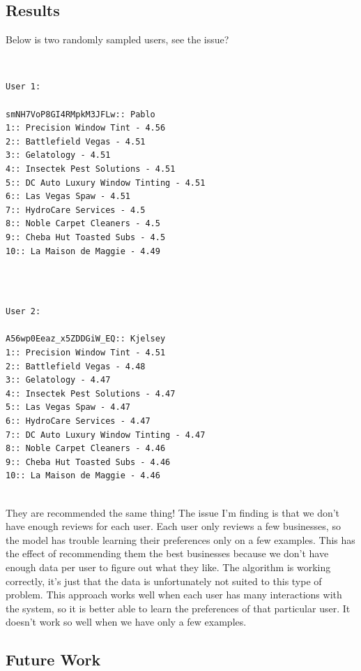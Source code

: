 \documentclass{article}
\begin{document}
\subsection*{Results}

Below is two randomly sampled users, see the issue?

\mbox{}\\
\begin{verbatim}
User 1:

smNH7VoP8GI4RMpkM3JFLw:: Pablo
1:: Precision Window Tint - 4.56
2:: Battlefield Vegas - 4.51
3:: Gelatology - 4.51
4:: Insectek Pest Solutions - 4.51
5:: DC Auto Luxury Window Tinting - 4.51
6:: Las Vegas Spaw - 4.51
7:: HydroCare Services - 4.5
8:: Noble Carpet Cleaners - 4.5
9:: Cheba Hut Toasted Subs - 4.5
10:: La Maison de Maggie - 4.49
\end{verbatim}
\mbox{}\\

\mbox{}\\
\begin{verbatim}
User 2:

A56wp0Eeaz_x5ZDDGiW_EQ:: Kjelsey
1:: Precision Window Tint - 4.51
2:: Battlefield Vegas - 4.48
3:: Gelatology - 4.47
4:: Insectek Pest Solutions - 4.47
5:: Las Vegas Spaw - 4.47
6:: HydroCare Services - 4.47
7:: DC Auto Luxury Window Tinting - 4.47
8:: Noble Carpet Cleaners - 4.46
9:: Cheba Hut Toasted Subs - 4.46
10:: La Maison de Maggie - 4.46
\end{verbatim}
\mbox{}\\

They are recommended the same thing!  The issue I'm finding is that we don't have enough reviews for each user. Each user only reviews a few businesses, so the model has trouble learning their preferences only on a few examples. This has the effect of recommending them the best businesses because we don't have enough data per user to figure out what they like. The algorithm is working correctly, it's just that the data is unfortunately not suited to this type of problem. This approach works well when each user has many interactions with the system, so it is better able to learn the preferences of that particular user. It doesn't work so well when we have only a few examples. 

\subsection*{Future Work}
\end{document}
